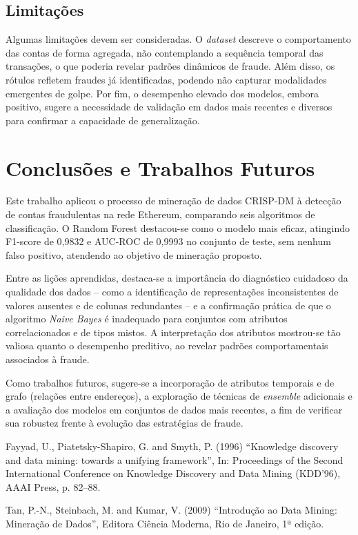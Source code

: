\documentclass[12pt]{article}
\begin{document}
\subsection{Limitações}

Algumas limitações devem ser consideradas. O \textit{dataset} descreve
o comportamento das contas de forma agregada, não contemplando a
sequência temporal das transações, o que poderia revelar padrões
dinâmicos de fraude. Além disso, os rótulos refletem fraudes já
identificadas, podendo não capturar modalidades emergentes de golpe.
Por fim, o desempenho elevado dos modelos, embora positivo, sugere a
necessidade de validação em dados mais recentes e diversos para
confirmar a capacidade de generalização.

\section{Conclusões e Trabalhos Futuros}

Este trabalho aplicou o processo de mineração de dados CRISP-DM à
detecção de contas fraudulentas na rede Ethereum, comparando seis
algoritmos de classificação. O Random Forest destacou-se como o modelo
mais eficaz, atingindo F1-score de 0,9832 e AUC-ROC de 0,9993 no
conjunto de teste, sem nenhum falso positivo, atendendo ao objetivo de
mineração proposto.

Entre as lições aprendidas, destaca-se a importância do diagnóstico
cuidadoso da qualidade dos dados -- como a identificação de
representações inconsistentes de valores ausentes e de colunas
redundantes -- e a confirmação prática de que o algoritmo \textit{Naive
Bayes} é inadequado para conjuntos com atributos correlacionados e de
tipos mistos. A interpretação dos atributos mostrou-se tão valiosa
quanto o desempenho preditivo, ao revelar padrões comportamentais
associados à fraude.

Como trabalhos futuros, sugere-se a incorporação de atributos
temporais e de grafo (relações entre endereços), a exploração de
técnicas de \textit{ensemble} adicionais e a avaliação dos modelos em
conjuntos de dados mais recentes, a fim de verificar sua robustez
frente à evolução das estratégias de fraude.

\begin{thebibliography}{}

Fayyad, U., Piatetsky-Shapiro, G. and Smyth, P. (1996) ``Knowledge
discovery and data mining: towards a unifying framework'', In:
Proceedings of the Second International Conference on Knowledge
Discovery and Data Mining (KDD'96), AAAI Press, p. 82--88.

Tan, P.-N., Steinbach, M. and Kumar, V. (2009) ``Introdução ao Data
Mining: Mineração de Dados'', Editora Ciência Moderna, Rio de Janeiro,
1ª edição.

\end{thebibliography}
\end{document}
